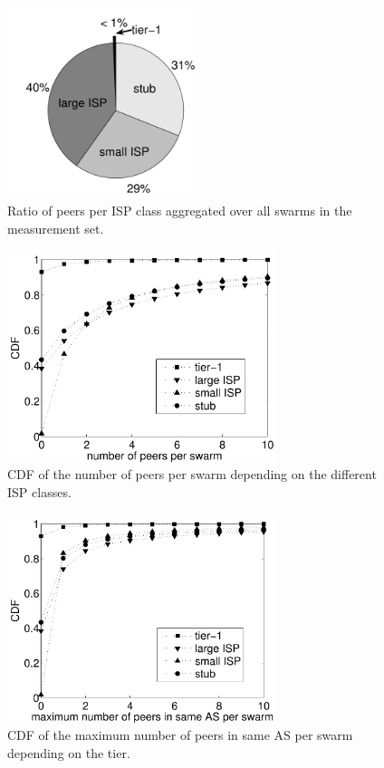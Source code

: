 \begin{figure}[bt]
\centering
	\includegraphics[width=0.5\textwidth]{aslevel/p2p/methodology/figs/npeers_perTier}
 	\caption{Ratio of peers per ISP class aggregated over all swarms in the measurement set.}
 	\label{fig:npeers_perTier}
\end{figure}

\begin{figure}[bt]
\centering
	\includegraphics[width=0.7\textwidth]{aslevel/p2p/methodology/figs/CDF_npeers_perswarm}
	\caption{CDF of the number of peers per swarm depending on the different ISP classes.}
	\label{fig:CDF_npeers_perswarm}
\end{figure}

\begin{figure}[bt]
\centering
	\includegraphics[width=0.7\textwidth]{aslevel/p2p/methodology/figs/CDF_maxpeers_perswarm_perAS}
	\caption{CDF of the maximum number of peers in same AS per swarm depending on the tier.}
	\label{fig:CDF_maxpeers_perswarm_perAS}
\end{figure}


